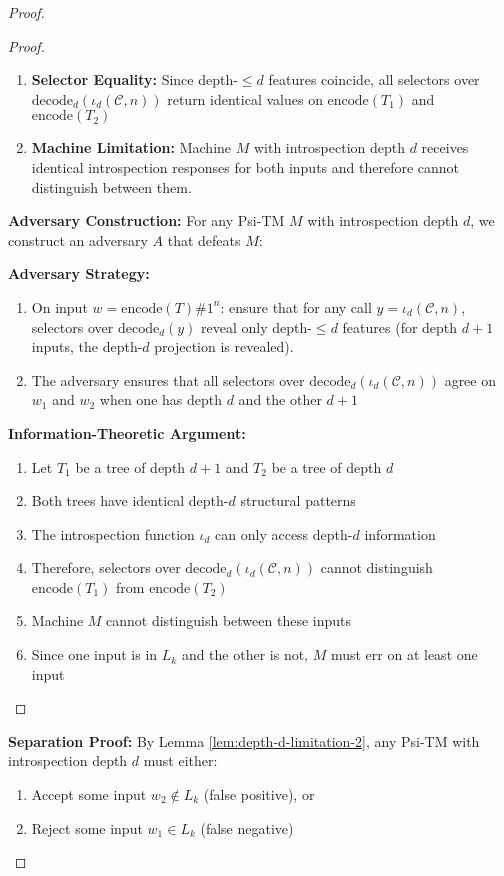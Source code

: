 \begin{proof}
\begin{proof}
\begin{enumerate}
\item \textbf{Selector Equality:}
  Since depth-$\le d$ features coincide, all selectors over $\mathrm{decode}_d(\iota_d(\mathcal{C},n))$ return identical values on $\text{encode}(T_1)$ and $\text{encode}(T_2)$

\item \textbf{Machine Limitation:}
  Machine $M$ with introspection depth $d$ receives identical introspection responses for both inputs and therefore cannot distinguish between them.
\end{enumerate}

\textbf{Adversary Construction:}
For any Psi-TM $M$ with introspection depth $d$, we construct an adversary $A$ that defeats $M$:

\textbf{Adversary Strategy:}
\begin{enumerate}
\item On input $w = \text{encode}(T)\#1^n$:
  ensure that for any call $y=\iota_d(\mathcal{C},n)$, selectors over $\mathrm{decode}_d(y)$ reveal only depth-$\le d$ features (for depth $d{+}1$ inputs, the depth-$d$ projection is revealed).
\item The adversary ensures that all selectors over $\mathrm{decode}_d(\iota_d(\mathcal{C},n))$ agree on $w_1$ and $w_2$ when one has depth $d$ and the other $d{+}1$
\end{enumerate}

\textbf{Information-Theoretic Argument:}
\begin{enumerate}
\item Let $T_1$ be a tree of depth $d+1$ and $T_2$ be a tree of depth $d$
\item Both trees have identical depth-$d$ structural patterns
\item The introspection function $\iota_d$ can only access depth-$d$ information
\item Therefore, selectors over $\mathrm{decode}_d(\iota_d(\mathcal{C},n))$ cannot distinguish $\text{encode}(T_1)$ from $\text{encode}(T_2)$
\item Machine $M$ cannot distinguish between these inputs
\item Since one input is in $L_k$ and the other is not, $M$ must err on at least one input
\end{enumerate}
\end{proof}

\textbf{Separation Proof:}
By Lemma \ref{lem:depth-d-limitation-2}, any Psi-TM with introspection depth $d$ must either:
\begin{enumerate}
\item Accept some input $w_2 \notin L_k$ (false positive), or
\item Reject some input $w_1 \in L_k$ (false negative)
\end{enumerate}


\end{proof}
